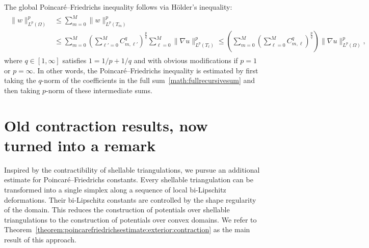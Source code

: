 \documentclass[10pt,a4paper]{article}
\begin{document}
\begin{remark}
    The global Poincar\'e--Friedrichs inequality follows via H\"older's inequality:
    \begin{align*}
        \begin{split}
            \| w \|_{L^{p}(\Omega)}^{p}
            &
            \leq 
            \sum_{m=0}^{M}
            \| w \|_{L^{p}(T_{m})}^{p}
            \\&
            \leq 
            \sum_{m=0}^{M}
            \left( \sum_{\ell'=0}^{M} C_{m,\ell'}^{q} \right)^{\frac p q}
            \sum_{\ell=0}^{M} 
            \| \nabla u \|_{L^{p}(T_{\ell})}^{p} 
            \leq 
            \left(
                \sum_{m=0}^{M}
                \left( \sum_{\ell=0}^{M} C_{m,\ell}^{q} \right)^{\frac p q}
            \right)
            \| \nabla u \|_{L^{p}(\Omega)}^{p} 
            ,
        \end{split}
    \end{align*}
    where $q \in [1,\infty]$ satisfies $1 = 1/p + 1/q$ and with obvious modifications if $p=1$ or $p=\infty$. 
    In other words, the Poincar\'e--Friedrichs inequality is estimated by first taking the $q$-norm of the coefficients in the full sum~\eqref{math:fullrecursivesum} and then taking $p$-norm of these intermediate sums.
\end{remark}



\section{Old contraction results, now turned into a remark}

Inspired by the contractibility of shellable triangulations, we pursue an additional estimate for Poincar\'e--Friedrichs constants. 
Every shellable triangulation can be transformed into a single simplex along a sequence of local bi-Lipschitz deformations. 
Their bi-Lipschitz constants are controlled by the shape regularity of the domain. 
This reduces the construction of potentials over shellable triangulations to the construction of potentials over convex domains.
We refer to Theorem~\ref{theorem:poincarefriedrichsestimate:exterior:contraction} as the main result of this approach. 
\end{document}
